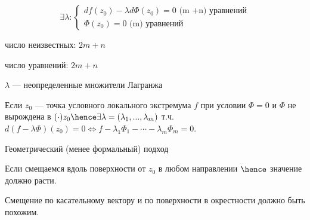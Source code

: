 \[
    \exists \lambda : 
    \begin{cases}
        df(z_0) - \lambda d\Phi(z_0) = 0 \text{ (m +n) уравнений} \\
        \Phi(z_0) = 0 \text{ (m) уравнений}
    \end{cases}
\]

число неизвестных: $2 m + n$

число уравнений: $2 m + n$

$\lambda$ --- неопределенные множители Лагранжа

\begin{theorem}
    Если $z_0$ --- точка условного локального экстремума $f$ при условии $\Phi = 0$ и $\Phi $ не вырождена в $(\cdot) z_0 \hence \exists \lambda = (\lambda_1, ..., \lambda_m)$ т.ч. $d(f - \lambda \Phi)(z_0) = 0 \Leftrightarrow f - \lambda_1 \Phi_1 - \cdots - \lambda_m \Phi_m = 0$. 
\end{theorem}


Геометрический (менее формальный) подход

Если смещаемся вдоль поверхности от $z_0$ в любом направлении $\hence$ значение должно расти.

Смещение по касательному вектору и по поверхности в окрестности должно быть похожим.

\quad


